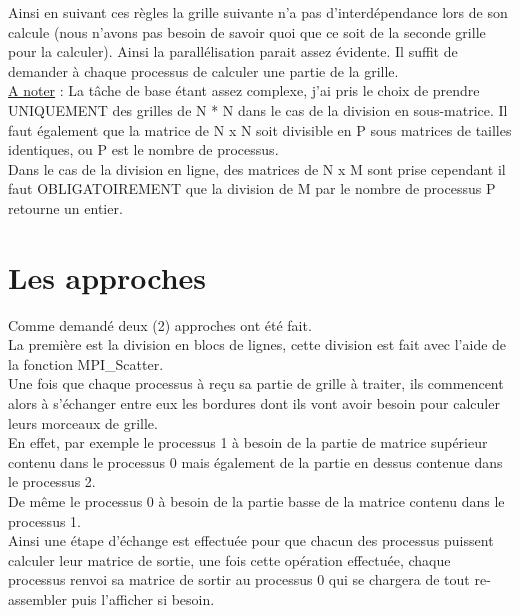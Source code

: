 \documentclass[10pt,a4paper]{article}
\begin{document}
Ainsi en suivant ces règles la grille suivante n'a pas d'interdépendance lors de son calcule (nous n'avons pas besoin de savoir quoi que ce soit de la seconde grille pour la calculer). Ainsi la parallélisation parait assez évidente. Il suffit de demander à chaque processus de calculer une partie de la grille. \\

\underline{A noter} : La tâche de base étant assez complexe, j'ai pris le choix de prendre UNIQUEMENT des grilles de N * N dans le cas de la division en sous-matrice. Il faut également que la matrice de N x N soit divisible en P sous matrices de tailles identiques, ou P est le nombre de processus.\\
Dans le cas de la division en ligne, des matrices de N x M sont prise cependant il faut OBLIGATOIREMENT que la division de M par le nombre de processus P retourne un entier. 

\section{Les approches}
Comme demandé deux (2) approches ont été fait. \\

La première est la division en blocs de lignes, cette division est fait avec l'aide de la fonction MPI\_Scatter. \\
Une fois que chaque processus à reçu sa partie de grille à traiter, ils commencent alors à s'échanger entre eux les bordures dont ils vont avoir besoin pour calculer leurs morceaux de grille. \\
En effet, par exemple le processus 1 à besoin de la partie de matrice supérieur contenu dans le processus 0 mais également de la partie en dessus contenue dans le processus 2. \\
De même le processus 0 à besoin de la partie basse de la matrice contenu dans le processus 1. \\

Ainsi une étape d'échange est effectuée pour que chacun des processus puissent calculer leur matrice de sortie, une fois cette opération effectuée, chaque processus renvoi sa matrice de sortir au processus 0 qui se chargera de tout re-assembler puis l'afficher si besoin. \\
\end{document}
